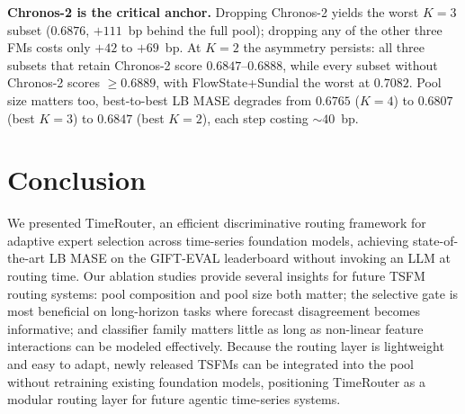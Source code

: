 \documentclass{article}
\theoremstyle{plain}
\theoremstyle{definition}
\theoremstyle{remark}
\begin{document}
\textbf{Chronos-2 is the critical anchor.} Dropping Chronos-2 yields the worst $K{=}3$ subset ($0.6876$, $+111$~bp behind the full pool); dropping any of the other three FMs costs only $+42$ to $+69$~bp. At $K{=}2$ the asymmetry persists: all three subsets that retain Chronos-2 score $0.6847$--$0.6888$, while every subset without Chronos-2 scores $\geq 0.6889$, with FlowState+Sundial the worst at $0.7082$. Pool size matters too, best-to-best LB MASE degrades from $0.6765$ ($K{=}4$) to $0.6807$ (best $K{=}3$) to $0.6847$ (best $K{=}2$), each step costing $\sim$$40$~bp.

\section{Conclusion}
\label{sec:conclusion}

We presented TimeRouter, an efficient discriminative routing framework for adaptive expert selection across time-series foundation models, achieving state-of-the-art LB MASE on the GIFT-EVAL leaderboard without invoking an LLM at routing time. Our ablation studies provide several insights for future TSFM routing systems: pool composition and pool size both matter; the selective gate is most beneficial on long-horizon tasks where forecast disagreement becomes informative; and classifier family matters little as long as non-linear feature interactions can be modeled effectively. Because the routing layer is lightweight and easy to adapt, newly released TSFMs can be integrated into the pool without retraining existing foundation models, positioning TimeRouter as a modular routing layer for future agentic time-series systems.

\end{document}
